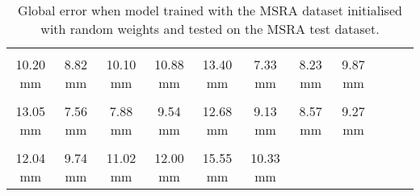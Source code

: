 \begin{table}[!ht]
    \begin{tabular}{|c|c|c|c|c|c|c|c|c|c|c|}
    \hline
    \cellcolor[HTML]{40ff00}{\bfseries Wrist} & \cellcolor[HTML]{00ff00}{\bfseries IMCP} & \cellcolor[HTML]{40ff00}{\bfseries IPIP} & \cellcolor[HTML]{40ff00}{\bfseries IDIP} & \cellcolor[HTML]{40ff00}{\bfseries ITIP} & \cellcolor[HTML]{00ff00}{\bfseries MMCP} & \cellcolor[HTML]{00ff00}{\bfseries MPIP} & \cellcolor[HTML]{00ff00}{\bfseries MDIP}  \\
    \cellcolor[HTML]{40ff00}$\,\,\,$10.20 mm & \cellcolor[HTML]{00ff00}$\,\,\,\,\,\,$8.82 mm & \cellcolor[HTML]{40ff00}$\,\,\,$10.10 mm & \cellcolor[HTML]{40ff00}$\,\,\,$10.88 mm & \cellcolor[HTML]{40ff00}$\,\,\,$13.40 mm & \cellcolor[HTML]{00ff00}$\,\,\,\,\,\,$7.33 mm & \cellcolor[HTML]{00ff00}$\,\,\,\,\,\,$8.23 mm & \cellcolor[HTML]{00ff00}$\,\,\,\,\,\,$9.87 mm\\
    \hline
    \cellcolor[HTML]{40ff00}{\bfseries MTIP} & \cellcolor[HTML]{00ff00}{\bfseries RMCP} & \cellcolor[HTML]{00ff00}{\bfseries RPIP} & \cellcolor[HTML]{00ff00}{\bfseries RDIP} & \cellcolor[HTML]{40ff00}{\bfseries RTIP} & \cellcolor[HTML]{00ff00}{\bfseries PMCP} & \cellcolor[HTML]{00ff00}{\bfseries PPIP} & \cellcolor[HTML]{00ff00}{\bfseries PDIP}  \\
    \cellcolor[HTML]{40ff00}$\,\,\,$13.05 mm & \cellcolor[HTML]{00ff00}$\,\,\,\,\,\,$7.56 mm & \cellcolor[HTML]{00ff00}$\,\,\,\,\,\,$7.88 mm & \cellcolor[HTML]{00ff00}$\,\,\,\,\,\,$9.54 mm & \cellcolor[HTML]{40ff00}$\,\,\,$12.68 mm & \cellcolor[HTML]{00ff00}$\,\,\,\,\,\,$9.13 mm & \cellcolor[HTML]{00ff00}$\,\,\,\,\,\,$8.57 mm & \cellcolor[HTML]{00ff00}$\,\,\,\,\,\,$9.27 mm\\
    \hline
    \cellcolor[HTML]{40ff00}{\bfseries PTIP} & \cellcolor[HTML]{00ff00}{\bfseries TMCP} & \cellcolor[HTML]{40ff00}{\bfseries TPIP} & \cellcolor[HTML]{40ff00}{\bfseries PDIP} & \cellcolor[HTML]{40ff00}{\bfseries TTIP} & \cellcolor[HTML]{40ff00}{\bfseries Average}  \\
    \cellcolor[HTML]{40ff00}$\,\,\,$12.04 mm & \cellcolor[HTML]{00ff00}$\,\,\,\,\,\,$9.74 mm & \cellcolor[HTML]{40ff00}$\,\,\,$11.02 mm & \cellcolor[HTML]{40ff00}$\,\,\,$12.00 mm & \cellcolor[HTML]{40ff00}$\,\,\,$15.55 mm & \cellcolor[HTML]{40ff00}$\,\,\,$10.33 mm \\
    \cline{1-6}
    \end{tabular}
    \caption{Global error when model trained with the MSRA dataset initialised with random weights and tested on the MSRA test dataset.}
    \label{tb:baseline_msra:g}
    \end{table}

